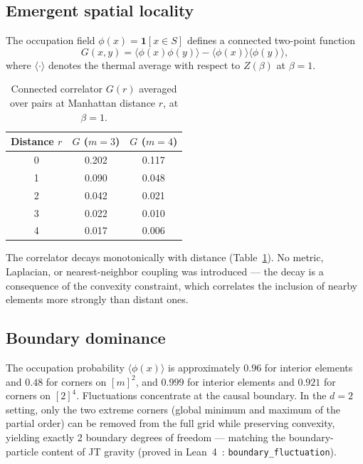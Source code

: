 \documentclass[aps,prd,twocolumn,superscriptaddress]{revtex4-2}
\begin{document}
\subsection{Emergent spatial locality}

The occupation field $\phi(x) = \mathbf{1}[x \in S]$ defines a
connected two-point function
\begin{equation}
G(x,y) = \langle \phi(x)\phi(y) \rangle - \langle \phi(x) \rangle \langle \phi(y) \rangle,
\end{equation}
where $\langle \cdot \rangle$ denotes the thermal average with
respect to $Z(\beta)$ at $\beta = 1$.

\begin{table}[h]
\caption{Connected correlator $G(r)$ averaged over pairs at
Manhattan distance $r$, at $\beta = 1$.}
\label{tab:correlator}
\begin{ruledtabular}
\begin{tabular}{ccc}
Distance $r$ & $G$ ($m=3$) & $G$ ($m=4$) \\
\midrule
0 & 0.202 & 0.117 \\
1 & 0.090 & 0.048 \\
2 & 0.042 & 0.021 \\
3 & 0.022 & 0.010 \\
4 & 0.017 & 0.006 \\
\end{tabular}
\end{ruledtabular}
\end{table}

The correlator decays monotonically with distance
(Table~\ref{tab:correlator}). No metric, Laplacian, or
nearest-neighbor coupling was introduced --- the decay is a
consequence of the convexity constraint, which correlates the
inclusion of nearby elements more strongly than distant ones.

\subsection{Boundary dominance}\label{sec:boundary}

The occupation probability $\langle \phi(x) \rangle$ is
approximately $0.96$ for interior elements and $0.48$ for corners
on $[m]^2$, and $0.999$ for interior elements and $0.921$ for
corners on $[2]^4$. Fluctuations concentrate at the causal
boundary. In the $d = 2$ setting, only the two extreme corners
(global minimum and maximum of the partial order) can be removed
from the full grid while preserving convexity, yielding exactly 2
boundary degrees of freedom --- matching the boundary-particle
content of JT gravity (proved in Lean~4~\cite{leanrepo}:
\texttt{boundary\_fluctuation}).
\end{document}
